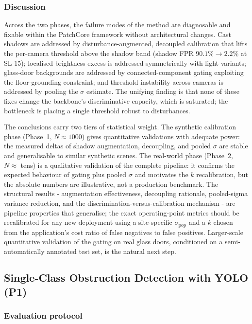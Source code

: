 \subsubsection{Discussion}

Across the two phases, the failure modes of the method are diagnosable and
fixable within the PatchCore framework without architectural changes. Cast
shadows are addressed by disturbance-augmented, decoupled calibration that lifts
the per-camera threshold above the shadow band (shadow FPR $90.1\% \to 2.2\%$ at
SL-15); localised brightness excess is addressed symmetrically with light
variants; glass-door backgrounds are addressed by connected-component gating
exploiting the floor-grounding constraint; and threshold instability across
cameras is addressed by pooling the $\sigma$ estimate. The unifying finding is that none of these fixes
change the backbone's discriminative capacity, which is saturated; the bottleneck
is placing a single threshold robust to disturbances.

The conclusions carry two tiers of statistical weight. The synthetic calibration
phase (Phase~1, $N \approx 1000$) gives quantitative validations with adequate
power: the measured deltas of shadow augmentation, decoupling, and pooled
$\sigma$ are stable and generalisable to similar synthetic scenes. The real-world
phase (Phase~2, $N \approx$ tens) is a qualitative validation of the complete
pipeline: it confirms the expected
behaviour of gating plus pooled $\sigma$ and motivates the $k$ recalibration, but
the absolute numbers are illustrative, not a production benchmark. The structural
results - augmentation effectiveness, decoupling rationale, pooled-sigma variance
reduction, and the discrimination-versus-calibration mechanism - are pipeline
properties that generalise; the exact operating-point metrics should be
recalibrated for any new deployment using a site-specific $\sigma_{\mathrm{pop}}$
and a $k$ chosen from the application's cost ratio of false negatives to false
positives. Larger-scale quantitative validation of the gating on real glass
doors, conditioned on a semi-automatically annotated test set, is the natural
next step.

\subsection{Single-Class Obstruction Detection with YOLO (P1)}
\label{ssec:p1-results}

\subsubsection{Evaluation protocol}

